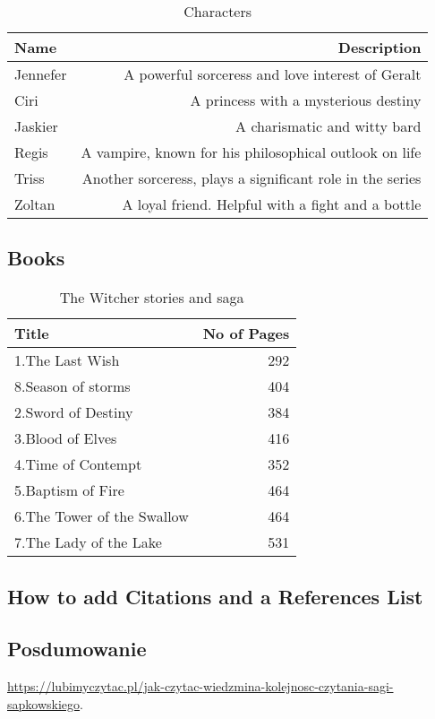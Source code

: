 \documentclass{article}
\begin{document}
\begin{table}
\centering
\begin{tabular}{l|r}
Name & Description \\\hline
Jennefer & A powerful sorceress and love interest of Geralt \\
Ciri & A princess with a mysterious destiny \\
Jaskier & A charismatic and witty bard \\
Regis & A vampire, known for his philosophical outlook on life \\
Triss & Another sorceress, plays a significant role in the series \\
Zoltan & A loyal friend. Helpful with a fight and a bottle \\
\end{tabular}
\caption{\label{tab:widgets}Characters}
\end{table}

\subsection{Books}

\begin{table}
\centering
\begin{tabular}{l|r}
Title & No of Pages \\\hline
1.The Last Wish & 292 \\
8.Season of storms & 404 \\
2.Sword of Destiny & 384 \\
3.Blood of Elves & 416 \\
4.Time of Contempt & 352  \\
5.Baptism of Fire & 464 \\
6.The Tower of the Swallow & 464 \\
7.The Lady of the Lake & 531 \\

\end{tabular}
\caption{\label{tab:widgets}The Witcher stories and saga}
\end{table}

\subsection{How to add Citations and a References List}


\subsection{Posdumowanie}



\url{https://lubimyczytac.pl/jak-czytac-wiedzmina-kolejnosc-czytania-sagi-sapkowskiego}.
\end{document}

